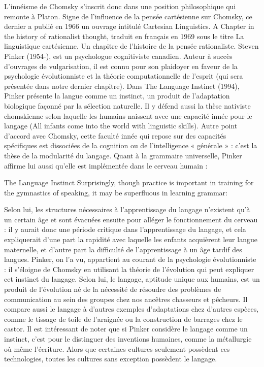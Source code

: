 L'innéisme de Chomsky s'inscrit donc dans une position philosophique qui remonte à Platon.
Signe de l'influence de la pensée cartésienne sur Chomsky, ce dernier a publié en 1966 un
ouvrage intitulé Cartesian Linguistics. A Chapter in the history of rationalist thought, traduit
en français en 1969 sous le titre La linguistique cartésienne. Un chapitre de l'histoire de la
pensée rationaliste.
Steven Pinker (1954-), est un psychologue cognitiviste canadien. Auteur à succès d'ouvrages
de vulgarisation, il est connu pour son plaidoyer en faveur de la psychologie évolutionniste et la
théorie computationnelle de l'esprit (qui sera présentée dans notre dernier chapitre).
Dans The Language Instinct (1994), Pinker présente la langue comme un instinct, un produit
de l'adaptation biologique façonné par la sélection naturelle. Il y défend aussi la thèse nativiste
chomskienne selon laquelle les humains naissent avec une capacité innée pour le langage (All
infants come into the world with linguistic skills). Autre point d'accord avec Chomsky, cette faculté
innée qui repose sur des capacités spécifiques est dissociées de la cognition ou de l'intelligence «
générale » : c'est la thèse de la modularité du langage. Quant à la grammaire universelle, Pinker
affirme lui aussi qu'elle est implémentée dans le cerveau humain :
\begin{lecture}{The Language Instinct}
Surprisingly, though practice is important in training for the gymnastics of speaking, it may be superfluous in learning grammar:
\end{lecture}
Selon lui, les structures nécessaires à l'apprentissage du langage n'existent qu'à un certain âge
et sont évacuées ensuite pour alléger le fonctionnement du cerveau : il y aurait donc une période
critique dans l'apprentissage du langage, et cela expliquerait d'une part la rapidité avec laquelle les
enfants acquièrent leur langue maternelle, et d'autre part la difficulté de l'apprentissage à un âge
tardif des langues.
Pinker, on l’a vu, appartient au courant de la psychologie évolutionniste : il s'éloigne de Chomsky
en utilisant la théorie de l'évolution qui peut expliquer cet instinct du langage. Selon lui, le
langage, aptitude unique aux humains, est un produit de l'évolution né de la nécessité de résoudre
des problèmes de communication au sein des groupes chez nos ancêtres chasseurs et pêcheurs.
Il compare aussi le langage à d’autres exemples d'adaptations chez d'autres espèces, comme le
tissage de toile de l’araignée ou la construction de barrages chez le castor. Il est intéressant de
noter que si Pinker considère le langage comme un instinct, c'est pour le distinguer des inventions
humaines, comme la métallurgie où même l'écriture. Alors que certaines cultures seulement
possèdent ces technologies, toutes les cultures sans exception possèdent le langage.

